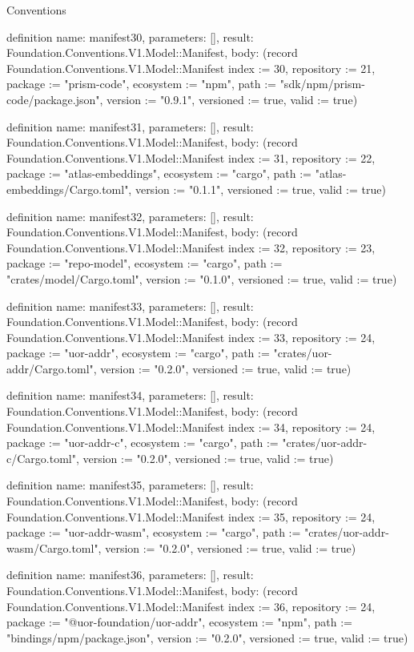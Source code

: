 \begin{lexlean}{Conventions}
\begin{semanticmodule}
definition{
  name: manifest30,
  parameters: [],
  result: Foundation.Conventions.V1.Model::Manifest,
  body: (record Foundation.Conventions.V1.Model::Manifest {index := 30, repository := 21, package := "prism-code", ecosystem := "npm", path := "sdk/npm/prism-code/package.json", version := "0.9.1", versioned := true, valid := true})
}

definition{
  name: manifest31,
  parameters: [],
  result: Foundation.Conventions.V1.Model::Manifest,
  body: (record Foundation.Conventions.V1.Model::Manifest {index := 31, repository := 22, package := "atlas-embeddings", ecosystem := "cargo", path := "atlas-embeddings/Cargo.toml", version := "0.1.1", versioned := true, valid := true})
}

definition{
  name: manifest32,
  parameters: [],
  result: Foundation.Conventions.V1.Model::Manifest,
  body: (record Foundation.Conventions.V1.Model::Manifest {index := 32, repository := 23, package := "repo-model", ecosystem := "cargo", path := "crates/model/Cargo.toml", version := "0.1.0", versioned := true, valid := true})
}

definition{
  name: manifest33,
  parameters: [],
  result: Foundation.Conventions.V1.Model::Manifest,
  body: (record Foundation.Conventions.V1.Model::Manifest {index := 33, repository := 24, package := "uor-addr", ecosystem := "cargo", path := "crates/uor-addr/Cargo.toml", version := "0.2.0", versioned := true, valid := true})
}

definition{
  name: manifest34,
  parameters: [],
  result: Foundation.Conventions.V1.Model::Manifest,
  body: (record Foundation.Conventions.V1.Model::Manifest {index := 34, repository := 24, package := "uor-addr-c", ecosystem := "cargo", path := "crates/uor-addr-c/Cargo.toml", version := "0.2.0", versioned := true, valid := true})
}

definition{
  name: manifest35,
  parameters: [],
  result: Foundation.Conventions.V1.Model::Manifest,
  body: (record Foundation.Conventions.V1.Model::Manifest {index := 35, repository := 24, package := "uor-addr-wasm", ecosystem := "cargo", path := "crates/uor-addr-wasm/Cargo.toml", version := "0.2.0", versioned := true, valid := true})
}

definition{
  name: manifest36,
  parameters: [],
  result: Foundation.Conventions.V1.Model::Manifest,
  body: (record Foundation.Conventions.V1.Model::Manifest {index := 36, repository := 24, package := "@uor-foundation/uor-addr", ecosystem := "npm", path := "bindings/npm/package.json", version := "0.2.0", versioned := true, valid := true})
}


\end{semanticmodule}
\end{lexlean}
